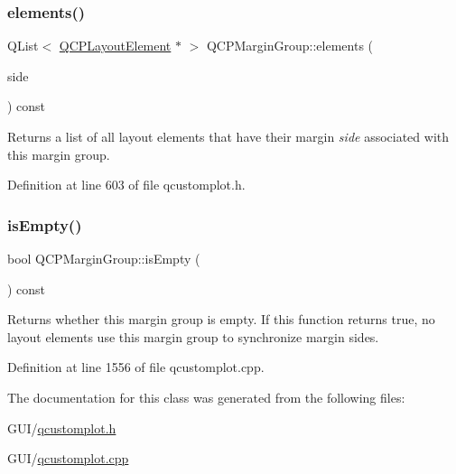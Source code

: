 \mbox{\label{class_q_c_p_margin_group_ac967a4dc5fe02ae44aeb43511d5e1bd4}} 
\subsubsection{\texorpdfstring{elements()}{elements()}}
{\footnotesize\ttfamily Q\+List$<$ \hyperlink{class_q_c_p_layout_element}{Q\+C\+P\+Layout\+Element} $\ast$ $>$ Q\+C\+P\+Margin\+Group\+::elements (\begin{DoxyParamCaption}\item[{\hyperlink{namespace_q_c_p_a7e487e3e2ccb62ab7771065bab7cae54}{Q\+C\+P\+::\+Margin\+Side}}]{side }\end{DoxyParamCaption}) const\hspace{0.3cm}{\ttfamily [inline]}}

Returns a list of all layout elements that have their margin {\itshape side} associated with this margin group. 

Definition at line 603 of file qcustomplot.\+h.

\mbox{\label{class_q_c_p_margin_group_ae0d32656d8a5fc5690c4e7693f9d0539}} 
\subsubsection{\texorpdfstring{is\+Empty()}{isEmpty()}}
{\footnotesize\ttfamily bool Q\+C\+P\+Margin\+Group\+::is\+Empty (\begin{DoxyParamCaption}{ }\end{DoxyParamCaption}) const}

Returns whether this margin group is empty. If this function returns true, no layout elements use this margin group to synchronize margin sides. 

Definition at line 1556 of file qcustomplot.\+cpp.



The documentation for this class was generated from the following files\+:\begin{DoxyCompactItemize}
\item 
G\+U\+I/\hyperlink{qcustomplot_8h}{qcustomplot.\+h}\item 
G\+U\+I/\hyperlink{qcustomplot_8cpp}{qcustomplot.\+cpp}\end{DoxyCompactItemize}
